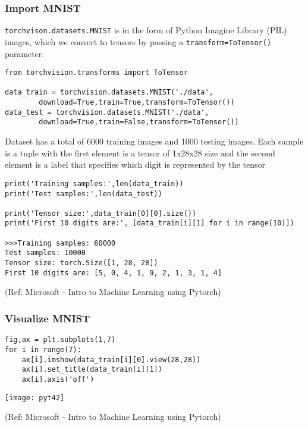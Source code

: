 \begin{frame}[fragile] \frametitle{Import MNIST}

\lstinline|torchvison.datasets.MNIST| is  in the form of Python Imagine Library (PIL) images, which we convert to tensors by passing a \lstinline|transform=ToTensor()| parameter.

\begin{lstlisting}
from torchvision.transforms import ToTensor

data_train = torchvision.datasets.MNIST('./data',
        download=True,train=True,transform=ToTensor())
data_test = torchvision.datasets.MNIST('./data',
        download=True,train=False,transform=ToTensor())
\end{lstlisting}

Dataset has  a total of 6000 training images and 1000 testing images. Each sample is a tuple with the first element is a tensor of 1x28x28 size and the second  element is a label that specifies which digit is represented by the tensor

\begin{lstlisting}
print('Training samples:',len(data_train))
print('Test samples:',len(data_test))

print('Tensor size:',data_train[0][0].size())
print('First 10 digits are:', [data_train[i][1] for i in range(10)])

>>>Training samples: 60000
Test samples: 10000
Tensor size: torch.Size([1, 28, 28])
First 10 digits are: [5, 0, 4, 1, 9, 2, 1, 3, 1, 4]
\end{lstlisting}



\tiny{(Ref: Microsoft - Intro to Machine Learning using Pytorch)}
\end{frame}

\begin{frame}[fragile] \frametitle{Visualize MNIST}


\begin{lstlisting}
fig,ax = plt.subplots(1,7)
for i in range(7):
    ax[i].imshow(data_train[i][0].view(28,28))
    ax[i].set_title(data_train[i][1])
    ax[i].axis('off')
\end{lstlisting}

\begin{center}
\texttt{[image: pyt42]}
\end{center}


\tiny{(Ref: Microsoft - Intro to Machine Learning using Pytorch)}
\end{frame}


